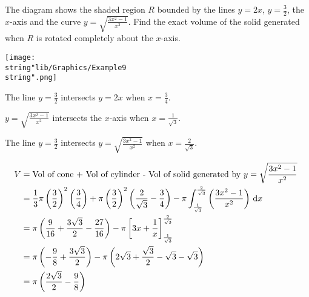 \documentclass[11pt,a4paper]{book}
\begin{document}
\begin{example}

The diagram shows the shaded region $R$ bounded by the lines $y=2x$,
${\displaystyle y=\frac{3}{2}}$, the $x$-axis and the curve ${\displaystyle y=\sqrt{\frac{3x^{2}-1}{x^{2}}}}$.
Find the exact volume of the solid generated when $R$ is rotated
completely about the $x$-axis.
\begin{center}
\texttt{[image: \\string"lib/Graphics/Example9\\string".png]}
\par\end{center}

\Solution

The line ${\displaystyle y=\frac{3}{2}}$ intersects $y=2x$ when
${\displaystyle x=\frac{3}{4}}$.

${\displaystyle y=\sqrt{\frac{3x^{2}-1}{x^{2}}}}$ intersects the
$x$-axis when ${\displaystyle x=\frac{1}{\sqrt{3}}}$.

The line ${\displaystyle y=\frac{3}{2}}$ intersects ${\displaystyle y=\sqrt{\frac{3x^{2}-1}{x^{2}}}}$
when ${\displaystyle x=\frac{2}{\sqrt{3}}}$.

\begin{align*}
V & =\text{Vol of cone + Vol of cylinder - Vol of solid generated by \ensuremath{{\displaystyle y=\sqrt{\frac{3x^{2}-1}{x^{2}}}}} }\\
 & =\frac{1}{3}\pi\left(\frac{3}{2}\right)^{2}\left(\frac{3}{4}\right)+\pi\left(\frac{3}{2}\right)^{2}\left(\frac{2}{\sqrt{3}}-\frac{3}{4}\right)-\pi\int_{\frac{1}{\sqrt{3}}}^{\frac{2}{\sqrt{3}}}\left(\frac{3x^{2}-1}{x^{2}}\right)\,\mathrm{d}x\\
 & =\pi\left(\frac{9}{16}+\frac{3\sqrt{3}}{2}-\frac{27}{16}\right)-\pi\left[3x+\frac{1}{x}\right]_{\frac{1}{\sqrt{3}}}^{\frac{2}{\sqrt{3}}}\\
 & =\pi\left(-\frac{9}{8}+\frac{3\sqrt{3}}{2}\right)-\pi\left(2\sqrt{3}+\frac{\sqrt{3}}{2}-\sqrt{3}-\sqrt{3}\right)\\
 & =\pi\left(\frac{2\sqrt{3}}{2}-\frac{9}{8}\right)
\end{align*}

\end{example}

\newpage
\end{document}
